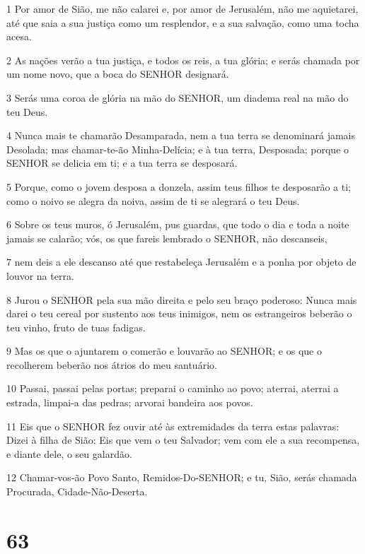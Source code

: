 \par 1 Por amor de Sião, me não calarei e, por amor de Jerusalém, não me aquietarei, até que saia a sua justiça como um resplendor, e a sua salvação, como uma tocha acesa.
\par 2 As nações verão a tua justiça, e todos os reis, a tua glória; e serás chamada por um nome novo, que a boca do SENHOR designará.
\par 3 Serás uma coroa de glória na mão do SENHOR, um diadema real na mão do teu Deus.
\par 4 Nunca mais te chamarão Desamparada, nem a tua terra se denominará jamais Desolada; mas chamar-te-ão Minha-Delícia; e à tua terra, Desposada; porque o SENHOR se delicia em ti; e a tua terra se desposará.
\par 5 Porque, como o jovem desposa a donzela, assim teus filhos te desposarão a ti; como o noivo se alegra da noiva, assim de ti se alegrará o teu Deus.
\par 6 Sobre os teus muros, ó Jerusalém, pus guardas, que todo o dia e toda a noite jamais se calarão; vós, os que fareis lembrado o SENHOR, não descanseis,
\par 7 nem deis a ele descanso até que restabeleça Jerusalém e a ponha por objeto de louvor na terra.
\par 8 Jurou o SENHOR pela sua mão direita e pelo seu braço poderoso: Nunca mais darei o teu cereal por sustento aos teus inimigos, nem os estrangeiros beberão o teu vinho, fruto de tuas fadigas.
\par 9 Mas os que o ajuntarem o comerão e louvarão ao SENHOR; e os que o recolherem beberão nos átrios do meu santuário.
\par 10 Passai, passai pelas portas; preparai o caminho ao povo; aterrai, aterrai a estrada, limpai-a das pedras; arvorai bandeira aos povos.
\par 11 Eis que o SENHOR fez ouvir até às extremidades da terra estas palavras: Dizei à filha de Sião: Eis que vem o teu Salvador; vem com ele a sua recompensa, e diante dele, o seu galardão.
\par 12 Chamar-vos-ão Povo Santo, Remidos-Do-SENHOR; e tu, Sião, serás chamada Procurada, Cidade-Não-Deserta.

\chapter{63}

